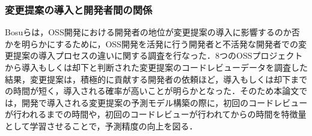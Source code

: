 \documentclass[T,J]{fose} %
\begin{document}


\subsubsection{変更提案の導入と開発者間の関係}
Bosu\cite{review1}らは，OSS開発における開発者の地位が変更提案の導入に影響するのか否かを明らかにするために，OSS開発を活発に行う開発者と不活発な開発者での変更提案の導入プロセスの違いに関する調査を行なった．8つのOSSプロジェクトから導入もしくは却下と判断された変更提案のコードレビューデータを調査した結果，変更提案は，積極的に貢献する開発者の依頼ほど，導入もしくは却下までの時間が短く，導入される確率が高いことが明らかとなった．そのため本論文では，開発で導入される変更提案の予測モデル構築の際に，初回のコードレビューが行われるまでの時間や，初回のコードレビューが行われてからの時間を特徴量として学習させることで，予測精度の向上を図る．



\end{document}

